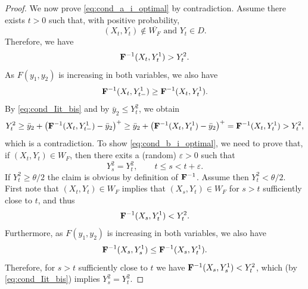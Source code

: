 \documentclass[10pt]{article}
\numberwithin{equation}{section}
\theoremstyle{plain}
\numberwithin{theorem}{section}
\theoremstyle{definition}
\newcommand{\<}{\langle}
\renewcommand{\>}{\rangle}
\renewcommand{\(}{\left(}
\renewcommand{\)}{\right)}
\newcommand\eps{\varepsilon}
\def \eps {{\varepsilon}}
\def \eps {{\varepsilon}}
\begin{document}
{{{\begin{proof}
We now prove \eqref{eq:cond_a_i_optimal} by contradiction. Assume there exists $t>0$ such that, with positive probability, 
\begin{equation}%
{(X_t,Y_t) \not\in \overline{W_F} \text{ and } Y_t \in D.}
\end{equation}
Therefore, we have 
\begin{equation}%
{\bf F}^{-1}(X_t , Y^{1}_{t}) > Y^2_{t}.
\end{equation}
As $F(y_1,y_2)$ is increasing in both variables, we also have 
\begin{equation}%
{\bf F}^{-1}(X_t , Y^{1}_{t-}) \geq  {\bf F}^{-1}(X_t , Y^{1}_{t}) .
\end{equation}
By \eqref{eq:cond_Iit_bis} and by $\bar y_2\leq Y^2_{t}$, we obtain
\begin{equation}%
Y^2_{t} \geq \bar y_{2} +  \big(  {\bf F}^{-1}(X_t , Y^1_{t-}) - \bar y_{2} \big)^+ \geq  \bar y_{2} + \big(  {\bf F}^{-1}(X_t , Y^1_{t}) - \bar y_{2} \big)^+ = {\bf F}^{-1}(X_t , Y^1_{t}) > Y^2_{t},
\end{equation}
which is a contradiction. To show \eqref{eq:cond_b_i_optimal}, we need to prove that, if $(X_t, Y_t) \in W_F$, then there exits a (random) $\eps>0$ such that 
\begin{equation}\label{eq:dYtzero}
Y^2_s=Y^2_t, \qquad t\leq s< t+\eps.
\end{equation}
If $Y^2_t\geq \theta/2$ the claim is obvious by definition of ${\bf F}^{-1}$. Assume then $Y^2_t< \theta/2$. %
First note that $ (X_t,Y_t) \in {W_F} $ implies that $ (X_s,Y_t) \in {W_F} $ for $s> t$ sufficiently close to $t$, and thus
\begin{equation}%
{\bf F}^{-1}(X_s , Y^{1}_{t}) < Y^2_{t}.
\end{equation}
Furthermore, as $F(y_1,y_2)$ is increasing in both variables, we also have 
\begin{equation}%
{\bf F}^{-1}(X_s , Y^{1}_{s}) \leq {\bf F}^{-1}(X_s , Y^{1}_{t}).
\end{equation}
Therefore, for $s>t$ sufficiently close to $t$ we have ${\bf F}^{-1}(X_s , Y^{1}_{s}) < Y^2_{t}$, which (by \eqref{eq:cond_Iit_bis}) implies $Y^2_s = Y^2_t$.


\end{proof}}}}
\end{document}
